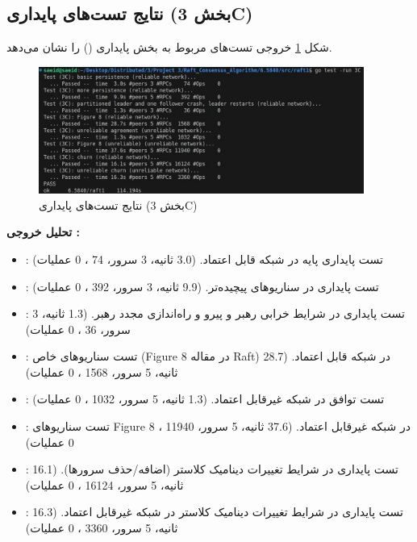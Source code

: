 \documentclass[12pt,a4paper]{article}
\begin{document}
\subsection{نتایج تست‌های پایداری (بخش 3C)}

شکل \ref{fig:3C} خروجی تست‌های مربوط به بخش پایداری () را نشان می‌دهد.

\begin{figure}[H]
    \centering
    \includegraphics[width=0.95\textwidth]{3C.jpg}
    \caption{نتایج تست‌های پایداری (بخش 3C)}
    \label{fig:3C}
\end{figure}

\textbf{تحلیل خروجی :}
\begin{itemize}
    \item {}: تست پایداری پایه در شبکه قابل اعتماد. (3.0 ثانیه، 3 سرور، 74 ، 0 عملیات)
    \item {}: تست پایداری در سناریوهای پیچیده‌تر. (9.9 ثانیه، 3 سرور، 392 ، 0 عملیات)
    \item {}: تست پایداری در شرایط خرابی رهبر و پیرو و راه‌اندازی مجدد رهبر. (1.3 ثانیه، 3 سرور، 36 ، 0 عملیات)
    \item {}: تست سناریوهای خاص (Figure 8 در مقاله Raft) در شبکه قابل اعتماد. (28.7 ثانیه، 5 سرور، 1568 ، 0 عملیات)
    \item {}: تست توافق در شبکه غیرقابل اعتماد. (1.3 ثانیه، 5 سرور، 1032 ، 0 عملیات)
    \item {}: تست سناریوهای Figure 8 در شبکه غیرقابل اعتماد. (37.6 ثانیه، 5 سرور، 11940 ، 0 عملیات)
    \item {}: تست پایداری در شرایط تغییرات دینامیک کلاستر (اضافه/حذف سرورها). (16.1 ثانیه، 5 سرور، 16124 ، 0 عملیات)
    \item {}: تست پایداری در شرایط تغییرات دینامیک کلاستر در شبکه غیرقابل اعتماد. (16.3 ثانیه، 5 سرور، 3360 ، 0 عملیات)
\end{itemize}
\end{document}

